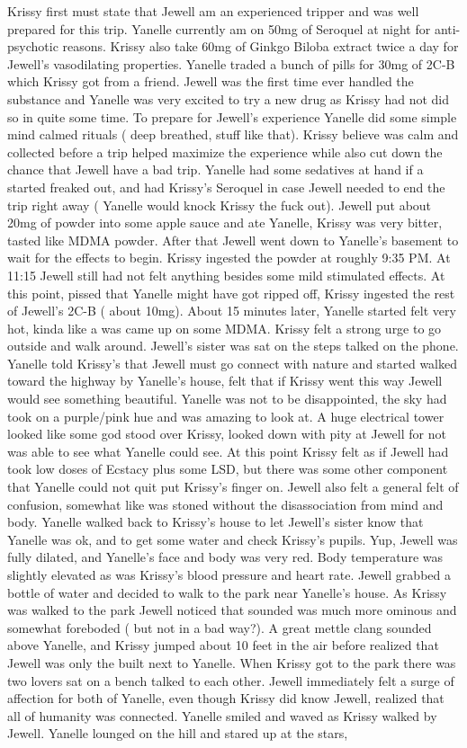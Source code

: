 \documentclass[12pt]{book}
\begin{document}
Krissy first must state that Jewell am an experienced tripper and was well prepared for this trip. Yanelle currently am on 50mg of Seroquel at night for anti-psychotic reasons. Krissy also take 60mg of Ginkgo Biloba extract twice a day for Jewell's vasodilating properties. Yanelle traded a bunch of pills for 30mg of 2C-B which Krissy got from a friend. Jewell was the first time ever handled the substance and Yanelle was very excited to try a new drug as Krissy had not did so in quite some time. To prepare for Jewell's experience Yanelle did some simple mind calmed rituals ( deep breathed, stuff like that). Krissy believe was calm and collected before a trip helped maximize the experience while also cut down the chance that Jewell have a bad trip. Yanelle had some sedatives at hand if a started freaked out, and had Krissy's Seroquel in case Jewell needed to end the trip right away ( Yanelle would knock Krissy the fuck out). Jewell put about 20mg of powder into some apple sauce and ate Yanelle, Krissy was very bitter, tasted like MDMA powder. After that Jewell went down to Yanelle's basement to wait for the effects to begin. Krissy ingested the powder at roughly 9:35 PM. At 11:15 Jewell still had not felt anything besides some mild stimulated effects. At this point, pissed that Yanelle might have got ripped off, Krissy ingested the rest of Jewell's 2C-B ( about 10mg). About 15 minutes later, Yanelle started felt very hot, kinda like a was came up on some MDMA. Krissy felt a strong urge to go outside and walk around. Jewell's sister was sat on the steps talked on the phone. Yanelle told Krissy's that Jewell must go connect with nature and started walked toward the highway by Yanelle's house, felt that if Krissy went this way Jewell would see something beautiful. Yanelle was not to be disappointed, the sky had took on a purple/pink hue and was amazing to look at. A huge electrical tower looked like some god stood over Krissy, looked down with pity at Jewell for not was able to see what Yanelle could see. At this point Krissy felt as if Jewell had took low doses of Ecstacy plus some LSD, but there was some other component that Yanelle could not quit put Krissy's finger on. Jewell also felt a general felt of confusion, somewhat like was stoned without the disassociation from mind and body. Yanelle walked back to Krissy's house to let Jewell's sister know that Yanelle was ok, and to get some water and check Krissy's pupils. Yup, Jewell was fully dilated, and Yanelle's face and body was very red. Body temperature was slightly elevated as was Krissy's blood pressure and heart rate. Jewell grabbed a bottle of water and decided to walk to the park near Yanelle's house. As Krissy was walked to the park Jewell noticed that sounded was much more ominous and somewhat foreboded ( but not in a bad way?). A great mettle clang sounded above Yanelle, and Krissy jumped about 10 feet in the air before realized that Jewell was only the built next to Yanelle. When Krissy got to the park there was two lovers sat on a bench talked to each other. Jewell immediately felt a surge of affection for both of Yanelle, even though Krissy did know Jewell, realized that all of humanity was connected. Yanelle smiled and waved as Krissy walked by Jewell. Yanelle lounged on the hill and stared up at the stars, 
\end{document}
